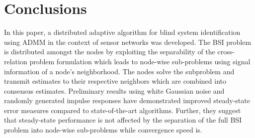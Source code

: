 \documentclass{article}
\begin{document}
\section{Conclusions}
\label{sec:conclusion}
In this paper, a distributed adaptive algorithm for blind system identification using ADMM in the context of sensor networks was developed.
The BSI problem is distributed amongst the nodes by exploiting the separability of the cross-relation problem formulation which leads to node-wise sub-problems using signal information of a node's neighborhood.
The nodes solve the subproblem and transmit estimates to their respective neighbors which are combined into consensus estimates.
Preliminary results using white Gaussian noise and randomly generated impulse responses have demonstrated improved steady-state error measures compared to state-of-the-art algorithms.
Further, they suggest that steady-state performance is not affected by the separation of the full BSI problem into node-wise sub-problems while convergence speed is.



\end{document}
